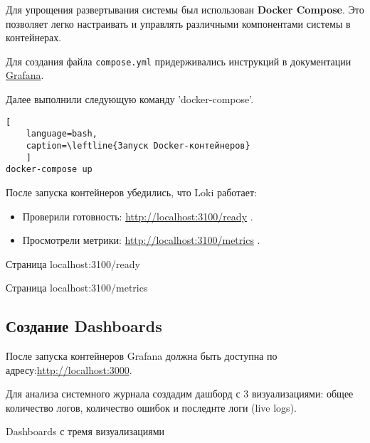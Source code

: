 Для упрощения развертывания системы был использован \textbf{Docker Compose}.
Это позволяет легко настраивать
и управлять различными компонентами системы в контейнерах.

Для создания файла \texttt{compose.yml}
придерживались инструкций в документации
\href{https://grafana.com/docs/loki/latest/setup/install/docker/}{Grafana}.



Далее выполнили следующую команду 'docker-compose'.

\begin{lstlisting}[
	language=bash,
	caption=\leftline{Запуск Docker-контейнеров}
	]
docker-compose up
\end{lstlisting}

После запуска контейнеров убедились, что Loki работает:
\begin{itemize}
	\item Проверили готовность:
		\url{http://localhost:3100/ready} .
	\item Просмотрели метрики:
		\url{http://localhost:3100/metrics} .
\end{itemize}

\begin{image}
    \caption{Страница localhost:3100/ready}
    \label{fig:loki:ready}
\end{image}

\begin{image}
    \caption{Страница localhost:3100/metrics}
    \label{fig:loki:metrics}
\end{image}

\subsection{Создание Dashboards}

После запуска контейнеров Grafana должна быть доступна
по адресу:\url{http://localhost:3000}.

Для анализа системного журнала создадим дашборд
с 3 визуализациями: общее количество логов, количество ошибок
и последнте логи (live logs).

\begin{image}
    \caption{Dashboards с тремя визуализациями}
    \label{fig:dashboard}
\end{image}

